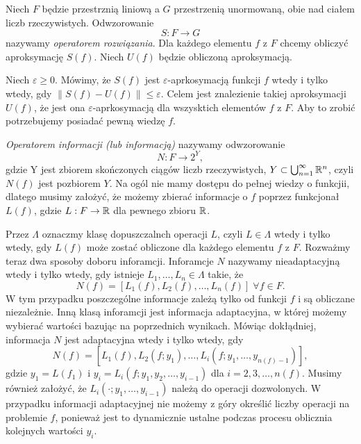 \documentclass[oik, pdftex, robocza, man]{mgrwms}
\begin{document}
    Niech $F$ będzie przestrznią liniową a $G$ przestrzenią unormowaną, obie nad ciałem liczb rzeczywistych. Odwzorowanie 
    \begin{equation*}
        S : F \rightarrow G
    \end{equation*}
    nazywamy \textit{operatorem rozwiązania}. Dla każdego elementu $f$ z $F$ chcemy obliczyć aproksymację $S(f)$. Niech $U(f)$ będzie obliczoną aproksymacją.

    Niech $\varepsilon \geq 0$. Mówimy, że $S(f)$ jest $\varepsilon$-aprkosymacją funkcji $f$ wtedy i tylko wtedy, gdy $\| S(f) -  U(f)\| \leq \varepsilon$. Celem jest znalezienie takiej aproksymacji $U(f)$, że jest ona $\varepsilon$-aprkosymacją dla wszysktich elementów $f$ z $F$. Aby to zrobić potrzebujemy posiadać pewną wiedzę $f$.

    \textit{Operatorem informacji (lub informacją)} nazywamy odwzorowanie
    \begin{equation*}
        N : F \rightarrow 2^{Y},
    \end{equation*}
    gdzie Y jest zbiorem skończonych ciągów liczb rzeczywistych, $ Y \subset \bigcup^{\infty}_{n=1} \mathbb{R}^{n}$, czyli $N(f)$ jest pozbiorem $Y$.
    Na ogól nie mamy dostępu do pełnej wiedzy o funkcjii, dlatego musimy założyć, że możemy zbierać informacje o $f$ poprzez funkcjonał $L(f)$, gdzie $L : F \rightarrow \mathbb{R}$ dla pewnego zbioru $\mathbb{R}$.
    
    Przez $\Lambda$ oznaczmy klasę dopuszczalnch operacji $L$, czyli $L \in \Lambda$ wtedy i tylko wtedy, gdy $L(f)$ może zostać obliczone dla każdego elementu $f$ z $F$. Rozważmy teraz dwa sposoby doboru inforamcji. Inforamcje $N$ nazywamy nieadaptacyjną wtedy i tylko wtedy, gdy istnieje $L_{1}, \ldots, L_{n} \in \Lambda$ takie, że
    \begin{equation*}
        N(f) = \left[ L_{1}(f), L_{2}(f), \ldots, L_{n}(f) \right] \; \forall f \in F.
    \end{equation*}
    W tym przypadku poszczególne informacje zależą tylko od funkcji $f$ i są obliczane niezależnie.
    Inną klasą inforamcji jest informacja adaptacyjna, w której możemy wybierać wartości bazując na poprzednich wynikach. Mówiąc dokłądniej, informacja $N$ jest adaptacyjna wtedy i tylko wtedy, gdy
    \begin{equation*}
        N(f) = \left[ L_{1}(f), L_{2}(f; y_{1}), \ldots, L_{i}(f; y_{1}, \ldots, y_{n(f)-1}) \right],
    \end{equation*}
    gdzie $y_{1} = L(f_{1})$ i $y_{i} = L_{i}(f; y_{1}, y_{2}, \ldots, y_{i-1})$ dla $i=2,3,\ldots,n(f)$. Musimy również założyć, że $L_{i}(\cdot;y_{1}, \ldots, y_{i-1})$ należą do operacji dozwolonych. W przypadku informacji adaptacyjnej nie możemy z góry określić liczby operacji na problemie $f$, ponieważ jest to dynamicznie ustalne podczas procesu oblicznia kolejnych wartości $y_{i}$.
\end{document}

